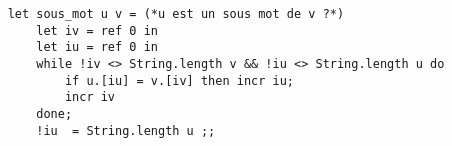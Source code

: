 \documentclass[varwidth = 20cm]{standalone}
\begin{document}
\begin{verbatim}
    let sous_mot u v = (*u est un sous mot de v ?*)
        let iv = ref 0 in 
        let iu = ref 0 in
        while !iv <> String.length v && !iu <> String.length u do 
            if u.[iu] = v.[iv] then incr iu;
            incr iv
        done;
        !iu  = String.length u ;;
\end{verbatim}
\end{document}

